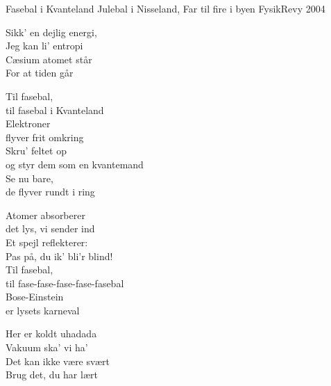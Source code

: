 \begin{song}{Fasebal i Kvanteland}
  {} %
  {Julebal i Nisseland, Far til fire i byen} %
  {} %
  {FysikRevy 2004} %
  {\NotCCLIed} %

  \begin{SBVerse}
    Sikk' en dejlig energi,\\
    Jeg kan li' entropi\\
    Cæsium atomet står\\
    For at tiden går
  \end{SBVerse}

  \begin{SBChorus}
    Til fasebal,\\
    \hspace{1em}til fasebal i Kvanteland\\
    Elektroner\\
    \hspace{1em}flyver frit omkring\\
    Skru' feltet op\\
    \hspace{1em}og styr dem som en kvantemand\\
    Se nu bare,\\
    \hspace{1em}de flyver rundt i ring
  \end{SBChorus}

  \begin{SBSection*}
    Atomer absorberer\\
    \hspace{1em}det lys, vi sender ind\\
    Et spejl reflekterer:\\
    \hspace{1em}Pas på, du ik' bli'r blind!\\
    Til fasebal,\\
    \hspace{1em}til fase-fase-fase-fase-fasebal\\
    Bose-Einstein\\
    \hspace{1em}er lysets karneval
  \end{SBSection*}

  \begin{SBVerse}
    Her er koldt uhadada\\
    Vakuum ska' vi ha'\\
    Det kan ikke være svært\\
    Brug det, du har lært
  \end{SBVerse}


\end{song}
